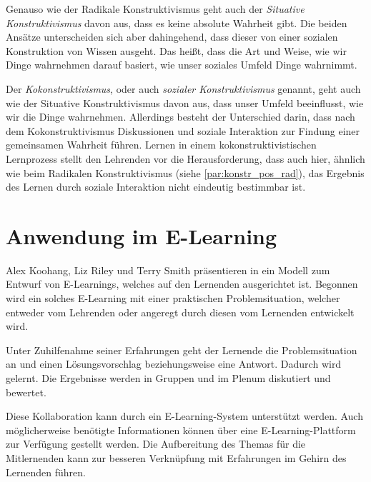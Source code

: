 Genauso wie der Radikale Konstruktivismus geht auch der \emph{Situative Konstruktivismus} davon aus, dass es keine absolute Wahrheit gibt. \cite{Anderson.1999} Die beiden Ansätze unterscheiden sich aber dahingehend, dass dieser von einer sozialen Konstruktion von Wissen ausgeht. Das heißt, dass die Art und Weise, wie wir Dinge wahrnehmen darauf basiert, wie unser soziales Umfeld Dinge wahrnimmt. \cite{Jonassen.1992} %

Der \emph{Kokonstruktivismus}, oder auch \emph{sozialer Konstruktivismus} genannt, geht auch wie der Situative Konstruktivismus davon aus, dass unser Umfeld beeinflusst, wie wir die Dinge wahrnehmen. Allerdings besteht der Unterschied darin, dass nach dem Kokonstruktivismus Diskussionen und soziale Interaktion zur Findung einer gemeinsamen Wahrheit führen. \cite{Bereiter.1994} Lernen in einem kokonstruktivistischen Lernprozess stellt den Lehrenden vor die Herausforderung, dass auch hier, ähnlich wie beim Radikalen Konstruktivismus (siehe \ref{par:konstr_pos_rad}), das Ergebnis des Lernen durch soziale Interaktion nicht eindeutig bestimmbar ist. \cite{Anderson.1999}

\section{Anwendung im E-Learning}
\label{sec:Konstr_Anwendungsfaelle}
Alex Koohang, Liz Riley und Terry Smith präsentieren in \cite[S. 95]{Koohang.2009} ein Modell zum Entwurf von E-Learnings, welches auf den Lernenden ausgerichtet ist. Begonnen wird ein solches E-Learning mit einer praktischen Problemsituation, welcher entweder vom Lehrenden oder angeregt durch diesen vom Lernenden entwickelt wird.
 
Unter Zuhilfenahme seiner Erfahrungen geht der Lernende die Problemsituation an und einen Lösungsvorschlag beziehungsweise eine Antwort. Dadurch wird gelernt. Die Ergebnisse werden in Gruppen und im Plenum diskutiert und bewertet. \cite[S. 95 - 96]{Koohang.2009}

Diese Kollaboration kann durch ein E-Learning-System unterstützt werden. Auch möglicherweise benötigte Informationen können über eine E-Learning-Plattform zur Verfügung gestellt werden. \cite[S. 96]{Koohang.2009} Die Aufbereitung des Themas für die Mitlernenden kann zur besseren Verknüpfung mit Erfahrungen im Gehirn des Lernenden führen. \cite[S. 101-102]{Koohang.2009}

